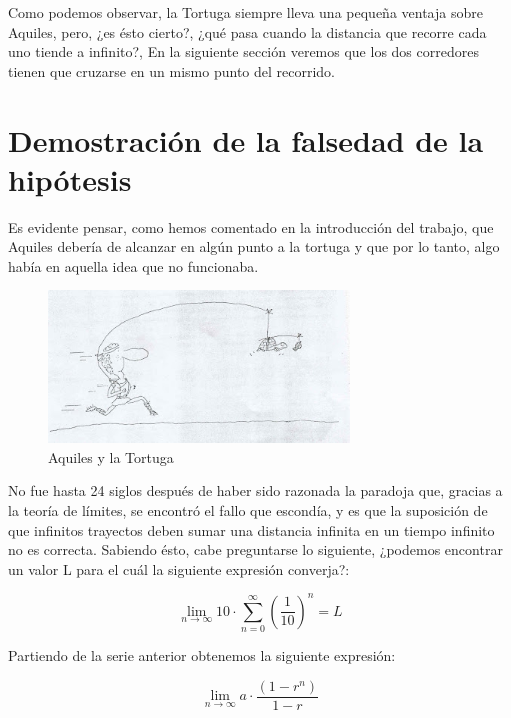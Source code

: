 \documentclass[a4paper,12pt]{article}
\begin{document}
   Como podemos observar, la Tortuga siempre lleva una pequeña ventaja sobre Aquiles, pero, ¿es ésto cierto?,
   ¿qué pasa cuando la distancia que recorre cada uno tiende a infinito?, 
   En la siguiente sección veremos que los dos corredores tienen que cruzarse en un mismo punto del recorrido.
   
   \section{Demostración de la falsedad de la hipótesis}
   
   Es evidente pensar, como hemos comentado en la introducción del trabajo, que Aquiles
   debería de alcanzar en algún punto a la tortuga y que por lo tanto, algo había
   en aquella idea que no funcionaba. 
   
   \begin{figure}[h]
   \begin{center}
   \includegraphics[width=8cm]{Imagenes/aquiles-tortuga.jpg}
   \end{center}
   \caption{Aquiles y la Tortuga}
   \label{fig:aquiles1}
   \end{figure} 
    
   \newpage
   
   No fue hasta 24 siglos después de haber sido razonada la paradoja que, 
   gracias a la teoría de límites, se encontró el fallo que escondía,
   y es que la suposición de que infinitos trayectos deben sumar una distancia infinita en 
   un tiempo infinito no es correcta. Sabiendo ésto, cabe preguntarse lo siguiente,      
   ¿podemos encontrar un valor L para el cuál la siguiente expresión converja?: 
   
   \begin{equation}
   \lim\limits_{n \rightarrow \infty} 10 \cdot \sum_{n=0}^\infty (\frac{1}{10})^n = L
   \end{equation}   
   
   Partiendo de la serie anterior obtenemos la siguiente expresión:
   
   \begin{equation}
   \lim\limits_{n \rightarrow \infty} a \cdot \frac{(1 - r^n)}{1 - r}
   \end{equation}
   
\end{document}
